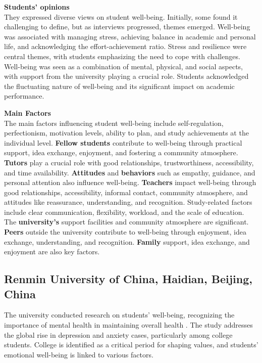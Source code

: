\vspace{5mm}

\noindent \textbf{Students' opinions} \\
They expressed diverse views on student well-being. Initially, some found it challenging to define, but as interviews progressed, themes emerged. Well-being was associated with managing stress, achieving balance in academic and personal life, and acknowledging the effort-achievement ratio. Stress and resilience were central themes, with students emphasizing the need to cope with challenges. Well-being was seen as a combination of mental, physical, and social aspects, with support from the university playing a crucial role. Students acknowledged the fluctuating nature of well-being and its significant impact on academic performance.

\vspace{5mm}

\noindent \textbf{Main Factors} \\
The main factors influencing student well-being include self-regulation, perfectionism, motivation levels, ability to plan, and study achievements at the individual level. \textbf{Fellow students} contribute to well-being through practical support, idea exchange, enjoyment, and fostering a community atmosphere. \textbf{Tutors} play a crucial role with good relationships, trustworthiness, accessibility, and time availability. \textbf{Attitudes} and \textbf{behaviors} such as empathy, guidance, and personal attention also influence well-being. \textbf{Teachers} impact well-being through good relationships, accessibility, informal contact, community atmosphere, and attitudes like reassurance, understanding, and recognition. Study-related factors include clear communication, flexibility, workload, and the scale of education. The \textbf{university's} support facilities and community atmosphere are significant. \textbf{Peers} outside the university contribute to well-being through enjoyment, idea exchange, understanding, and recognition. \textbf{Family} support, idea exchange, and enjoyment are also key factors.

\subsection{Renmin University of China, Haidian, Beijing, China}

The university conducted research on students' well-being, recognizing the importance of mental health in maintaining overall health \cite{research-2}. The study addresses the global rise in depression and anxiety cases, particularly among college students. College is identified as a critical period for shaping values, and students' emotional well-being is linked to various factors.


